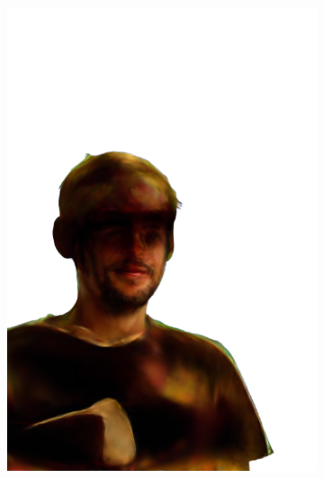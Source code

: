 \begin{figure}[ht]
\begin{subfigure}{0.08\linewidth}
        \includegraphics[width=\textwidth]{Figures/results/high/simon_cowboy/11_render.png}
	\end{subfigure}
    \begin{subfigure}{0.08\linewidth}%

\end{subfigure}
\end{figure}
